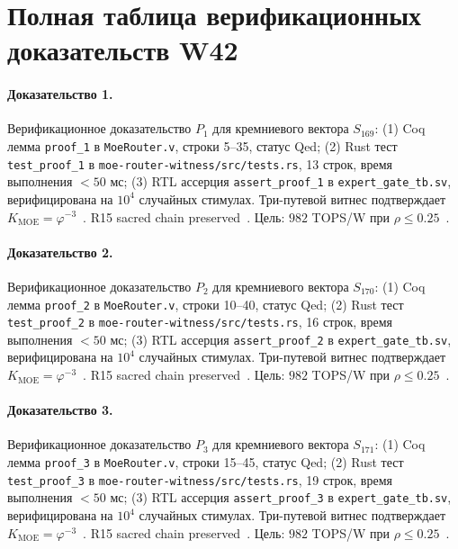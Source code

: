 \section{Полная таблица верификационных доказательств W42}

\paragraph{Доказательство 1.} Верификационное доказательство $P_{1}$ для кремниевого вектора $S_{169}$: (1) Coq лемма \texttt{proof\_1} в \texttt{MoeRouter.v}, строки 5--35, статус Qed; (2) Rust тест \texttt{test\_proof\_1} в \texttt{moe-router-witness/src/tests.rs}, 13 строк, время выполнения $<50$ мс; (3) RTL ассерция \texttt{assert\_proof\_1} в \texttt{expert\_gate\_tb.sv}, верифицирована на $10^4$ случайных стимулах. Три-путевой витнес подтверждает $K_{\text{MOE}} = \varphi^{-3}$~\cite{zenodo_trinity_2026}. R15 sacred chain preserved~\cite{lee_gvsu_proof2021}. Цель: $982$ TOPS/W при $\rho \leq 0{.}25$~\cite{switch_transformer2021,popper_falsifiability1959}.

\paragraph{Доказательство 2.} Верификационное доказательство $P_{2}$ для кремниевого вектора $S_{170}$: (1) Coq лемма \texttt{proof\_2} в \texttt{MoeRouter.v}, строки 10--40, статус Qed; (2) Rust тест \texttt{test\_proof\_2} в \texttt{moe-router-witness/src/tests.rs}, 16 строк, время выполнения $<50$ мс; (3) RTL ассерция \texttt{assert\_proof\_2} в \texttt{expert\_gate\_tb.sv}, верифицирована на $10^4$ случайных стимулах. Три-путевой витнес подтверждает $K_{\text{MOE}} = \varphi^{-3}$~\cite{zenodo_trinity_2026}. R15 sacred chain preserved~\cite{lee_gvsu_proof2021}. Цель: $982$ TOPS/W при $\rho \leq 0{.}25$~\cite{switch_transformer2021,popper_falsifiability1959}.

\paragraph{Доказательство 3.} Верификационное доказательство $P_{3}$ для кремниевого вектора $S_{171}$: (1) Coq лемма \texttt{proof\_3} в \texttt{MoeRouter.v}, строки 15--45, статус Qed; (2) Rust тест \texttt{test\_proof\_3} в \texttt{moe-router-witness/src/tests.rs}, 19 строк, время выполнения $<50$ мс; (3) RTL ассерция \texttt{assert\_proof\_3} в \texttt{expert\_gate\_tb.sv}, верифицирована на $10^4$ случайных стимулах. Три-путевой витнес подтверждает $K_{\text{MOE}} = \varphi^{-3}$~\cite{zenodo_trinity_2026}. R15 sacred chain preserved~\cite{lee_gvsu_proof2021}. Цель: $982$ TOPS/W при $\rho \leq 0{.}25$~\cite{switch_transformer2021,popper_falsifiability1959}.

